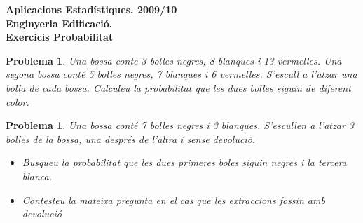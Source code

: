 \documentclass[11pt]{article}
\newcounter{prbcont}
\newtheorem{problema}[prbcont]{Problema}
\begin{document}
\begin{center}
\textbf{{\large {Aplicacions Estad\'{i}stiques. 2009/10}\\Enginyeria Edificaci\'o.\\}}
\vspace{0.5cm}
\textbf{Exercicis Probabilitat}
\end{center}

\begin{problema}
Una bossa conte 3 bolles negres, 8 blanques i 13 vermelles. Una segona bossa cont\'e 5 bolles negres, 7 blanques i 6 vermelles. S'escull a l'atzar una bolla de cada bossa. Calculeu la probabilitat que les dues bolles siguin de diferent color.
\end{problema}



\begin{problema}
Una bossa cont\'e 7 bolles negres i 3 blanques. S'escullen a l'atzar 3 bolles de la bossa, una despr\'es de l'altra i sense devoluci\'o. 
\begin{itemize}
\item Busqueu la probabilitat que les dues primeres boles siguin negres i la tercera blanca.
\item Contesteu la mateixa pregunta en el cas que les extraccions fossin amb devoluci\'o
\end{itemize}
\end{problema}
\end{document}
